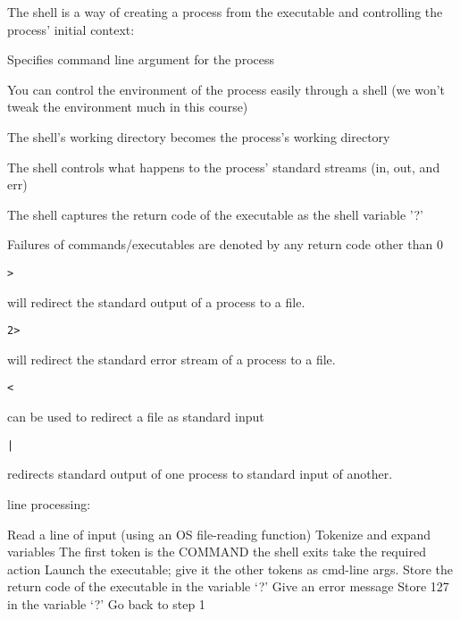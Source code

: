 \documentclass[landscape]{foils}
\begin{document}
\myNewSlide
\normalsize
\begin{compactenum}
	\item The shell is a way of creating a process from the executable and controlling the process' initial context:
	\begin{compactenum}
		\item Specifies command line argument for the process
		\item You can control the environment of the process easily through a shell (we won't tweak the environment much in this course)
		\item The shell's working directory becomes the process's working directory
		\item The shell controls what happens to the process' standard streams (in, out, and err)
		\item The shell captures the return code of the executable as the shell variable '?'
	\end{compactenum}
	\item Failures of commands/executables are denoted by any return code other than 0
	\item \begin{verbatim}>\end{verbatim} will redirect the standard output of a process to a file.
	\item \begin{verbatim}2>\end{verbatim} will redirect the standard error stream of a process to a file.
	\item \begin{verbatim}<\end{verbatim} can be used to redirect a file as standard input
	\item \begin{verbatim}|\end{verbatim} redirects standard output of one process to standard input of another.
\end{compactenum}


\myNewSlide
\normalsize
{} line processing:
\begin{algorithmic}[1]
	\STATE Read a line of input (using an OS file-reading function)
	\STATE Tokenize and expand variables
	\STATE The first token is the COMMAND
	\STATE the  shell exits
	\STATE take the required action
	\ELSE 
		\STATE Launch the executable; give it the other tokens as cmd-line args.
		\STATE Store the return code of the executable in the variable `?'
	\ELSE
		\STATE Give an error message
		\STATE Store 127 in the variable `?'
	\ENDIF
	\ENDIF
	\STATE Go back to step 1
\end{algorithmic}
\end{document}
